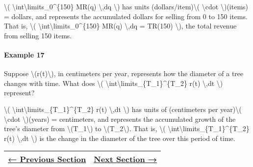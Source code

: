 \textbackslash{}(
\textbackslash{}int\textbackslash{}limits\_0\^{}\{150\} MR(q)
\textbackslash{},dq \textbackslash{}) has units
(dollars/item)\textbackslash{}( \textbackslash{}cdot
\textbackslash{})(items) = dollars, and represents the accumulated
dollars for selling from 0 to 150 items. That is, \textbackslash{}(
\textbackslash{}int\textbackslash{}limits\_0\^{}\{150\} MR(q)
\textbackslash{},dq = TR(150) \textbackslash{}), the total revenue from
selling 150 items.

\hypertarget{example-17}{%
\paragraph{Example 17}\label{example-17}}

Suppose \textbackslash{}(r(t)\textbackslash{}), in centimeters per year,
represents how the diameter of a tree changes with time. What does
\textbackslash{}(
\textbackslash{}int\textbackslash{}limits\_\{T\_1\}\^{}\{T\_2\} r(t)
\textbackslash{},dt \textbackslash{}) represent?

\textbackslash{}(
\textbackslash{}int\textbackslash{}limits\_\{T\_1\}\^{}\{T\_2\} r(t)
\textbackslash{},dt \textbackslash{}) has units of (centimeters per
year)\textbackslash{}( \textbackslash{}cdot \textbackslash{})(years) =
centimeters, and represents the accumulated growth of the tree's
diameter from \textbackslash{}(T\_1\textbackslash{}) to
\textbackslash{}(T\_2\textbackslash{}). That is, \textbackslash{}(
\textbackslash{}int\textbackslash{}limits\_\{T\_1\}\^{}\{T\_2\} r(t)
\textbackslash{},dt \textbackslash{}) is the change in the diameter of
the tree over this period of time.

\begin{longtable}[]{@{}ll@{}}
\toprule
\endhead
\href{../chapter2/section2-11.php}{← Previous Section} &
\href{section3-2.php}{Next Section →}\tabularnewline
\bottomrule
\end{longtable}
